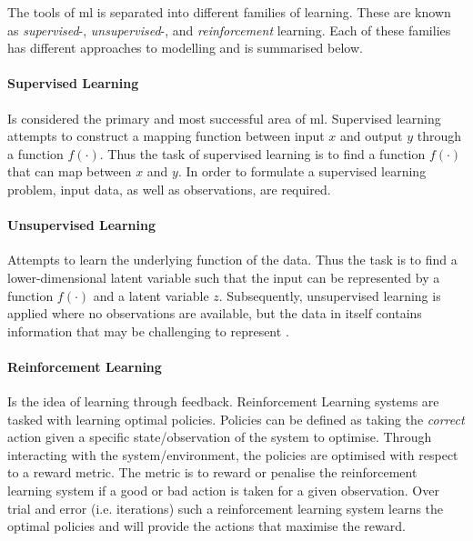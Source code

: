The tools of \gls{ml} is separated into different families of learning. These are known as \emph{supervised}-, \emph{unsupervised}-, and \emph{reinforcement} learning. Each of these families has different approaches to modelling and is summarised below. 

\paragraph{Supervised Learning}

Is considered the primary and most successful area of \gls{ml}. Supervised learning attempts to construct a mapping function between input $x$ and output $y$ through a function $f(\cdot)$. Thus the task of supervised learning is to find a function $f(\cdot)$ that can map between $x$ and $y$. In order to formulate a supervised learning problem, input data, as well as observations, are required. 

\paragraph{Unsupervised Learning}

Attempts to learn the underlying function of the data. Thus the task is to find a lower-dimensional latent variable such that the input can be represented by a function $f(\cdot)$ and a latent variable $z$. Subsequently, unsupervised learning is applied where no observations are available, but the data in itself contains information that may be challenging to represent \cite{M.Bishop2006}.

\paragraph{Reinforcement Learning}

Is the idea of learning through feedback. Reinforcement Learning systems are tasked with learning optimal policies. Policies can be defined as taking the \emph{correct} action given a specific state/observation of the system to optimise. Through interacting with the system/environment, the policies are optimised with respect to a reward metric. The metric is to reward or penalise the reinforcement learning system if a good or bad action is taken for a given observation. Over trial and error (i.e. iterations) such a reinforcement learning system learns the optimal policies and will provide the actions that maximise the reward. 

